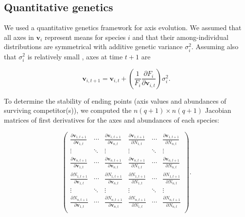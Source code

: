 \subsection*{Quantitative genetics}

We used a quantitative genetics framework for axis evolution.
We assumed that all axes in $\mathbf{v}_i$ represent means for species $i$
and that their among-individual distributions are symmetrical with additive
genetic variance $\sigma^2_i$.
Assuming also that $\sigma^2_i$ is relatively small
\citep{Iwasa:1991eo,Abrams:2001va,Abrams:1993cr}, axes at time $t+1$ are

\begin{equation} \label{eq:axis-change}
    \mathbf{v}_{i,t+1} = \mathbf{v}_{i,t} + \left( \frac{1}{F_i}
        \frac{\partial F_i}{\partial \mathbf{v}_{i,t}} \right) \sigma^2_i
    \textrm{.}
\end{equation}

To determine the stability of ending points (axis values and abundances of
surviving competitor(s)), we computed the $n (q+1) \times n (q+1)$ Jacobian matrices
of first derivatives for the axes and abundances of each species:

\begin{equation} \label{eq:jacobian}
    \begin{pmatrix}
        \frac{\partial \mathbf{v}_{1,t+1}}{\partial \mathbf{v}_{1,t}} & \cdots &
            \frac{\partial \mathbf{v}_{1,t+1}}{\partial \mathbf{v}_{n,t}} &
            \frac{\partial \mathbf{v}_{1,t+1}}{\partial N_{1,t}} & \cdots &
            \frac{\partial \mathbf{v}_{1,t+1}}{\partial N_{n,t}} \\
        \vdots & \ddots & \vdots & \vdots & \ddots & \vdots \\
        \frac{\partial \mathbf{v}_{n,t+1}}{\partial \mathbf{v}_{1,t}} & \cdots &
            \frac{\partial \mathbf{v}_{n,t+1}}{\partial \mathbf{v}_{n,t}} &
            \frac{\partial \mathbf{v}_{n,t+1}}{\partial N_{1,t}} & \cdots &
            \frac{\partial \mathbf{v}_{n,t+1}}{\partial N_{n,t}} \\[1ex]
%
%
        \frac{\partial N_{1,t+1}}{\partial \mathbf{v}_{1,t}} & \cdots &
            \frac{\partial N_{1,t+1}}{\partial \mathbf{v}_{n,t}} &
            \frac{\partial N_{1,t+1}}{\partial N_{1,t}} & \cdots &
            \frac{\partial N_{1,t+1}}{\partial N_{n,t}} \\
        \vdots & \ddots & \vdots & \vdots & \ddots & \vdots \\
        \frac{\partial N_{n,t+1}}{\partial \mathbf{v}_{1,t}} & \cdots &
            \frac{\partial N_{n,t+1}}{\partial \mathbf{v}_{n,t}} &
            \frac{\partial N_{n,t+1}}{\partial N_{1,t}} & \cdots &
            \frac{\partial N_{n,t+1}}{\partial N_{n,t}} \\
    \end{pmatrix}
    \text{.}
\end{equation}

